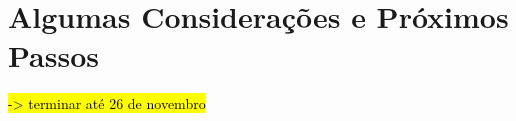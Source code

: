 \chapter{Algumas Considerações e Próximos Passos}\label{chap:considfinais}

\hl{-> terminar até 26 de novembro}




